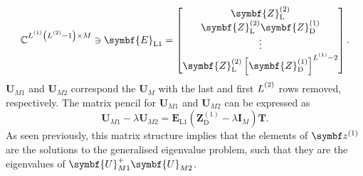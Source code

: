 {\begin{subequations}
\begin{gather}
        \mathbb{C}^{\Lone \left(\Ltwo - 1\right) \times M} \ni
        \symbf{E}_{\text{L}1} =
        \begin{bmatrix}
            \symbf{Z}^{(2)}_{\text{L}} \\
            \symbf{Z}^{(2)}_{\text{L}} \symbf{Z}^{(1)}_{\text{D}} \\
            \vdots \\
            \symbf{Z}^{(2)}_{\text{L}} \left[\symbf{Z}^{(1)}_{\text{D}}\right]^{\Lone - 2}
        \end{bmatrix}.
    \end{gather}
\end{subequations}
$\symbf{U}_{M1}$ and $\symbf{U}_{M2}$ correspond the $\symbf{U}_M$ with the
last and first $\Ltwo$ rows removed, respectively. The matrix pencil for
$\symbf{U}_{M1}$ and $\symbf{U}_{M2}$ can be expressed as
\begin{equation}
    \symbf{U}_{M1} - \lambda \symbf{U}_{M2} =
    \symbf{E}_{\text{L}1} \left( \symbf{Z}^{(1)}_{\text{D}} - \lambda \symbf{I}_M \right) \symbf{T}.
\end{equation}
As seen previously, this matrix structure implies that the elements of
$\bdzone$ are the solutions to the generalised eigenvalue problem, such that
they are the eigenvalues of $\symbf{U}_{M1}^{+} \symbf{U}_{M2}^{\vphantom{+}}$.

}
